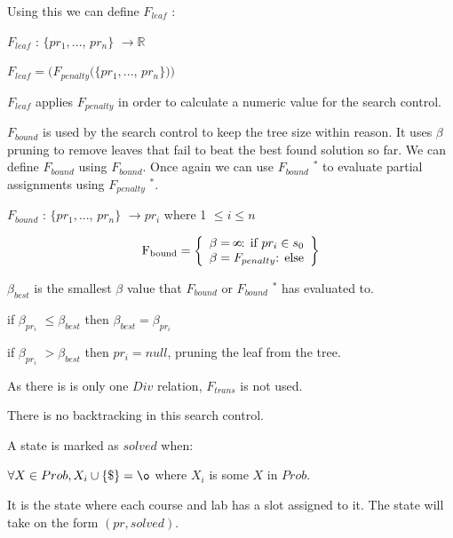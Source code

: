 \documentclass[11pt, oneside]{article}   	%
\def\infinity{\rotatebox{90}{8}}
\begin{document}
 
\bigskip
Using this we can define $F_{leaf}$ : 
\bigskip

$F_{leaf}$ : $\{pr_1, ...$, $pr_n \} $  $ \to \mathbb{R} $  

$F_{leaf} = (F_{penalty}(\{pr_1, ...$, $pr_n \}))$

\bigskip

$F_{leaf}$ applies $F_{penalty}$ in order to calculate a numeric value for the search control.

\bigskip
\bigskip


$F_{bound}$ is used by the search control to keep the tree size within reason. It uses $\beta$ pruning to remove leaves that fail to beat the best found solution so far.
We can define $F_{bound}$ using $F_{bound}$. Once again we can use $F_{bound}$ $^*$ to evaluate partial assignments using $F_{penalty}$ $^*$.

\bigskip
$F_{bound}$ : $\{pr_1, ...$, $pr_n \} $  $ \to pr_i $    where 1 $\leq i\leq n$

 \[
          \text{F\textsubscript{bound}} = \left\{\begin{array}{ll}
            \beta = \infinity $: if $pr_i \in s_0 \\
           \beta = F_{penalty} $: else$\\
            
            \end{array}\right\}
      \]
      
\bigskip

$\beta _{best}$ is the smallest $\beta$ value that $F_{bound}$ or  $F_{bound}$ $^*$ has evaluated to.


if $\beta _{pr_i}$ $\leq \beta _{best}$ then $\beta_ {best} = \beta _{pr_i } $


if $\beta _{pr_i}$  $> \beta _{best}$ then  $pr_i = null$, pruning the leaf from the tree.


\bigskip
\bigskip

As there is is only one $Div$ relation, $F_{trans}$ is not used. 

There is no backtracking in this search control.

\bigskip
\bigskip
\bigskip
A state is marked as $solved$ when:

\bigskip 

$\forall X \in Prob, X_i \cup \{ \$ \} = \o $ where $X_i$ is some $X$ in $Prob$.

It is the state where each course and lab has a slot assigned to it. The state will take on the form $(pr, solved)$.
\bigskip
\bigskip
\bigskip
\end{document}
